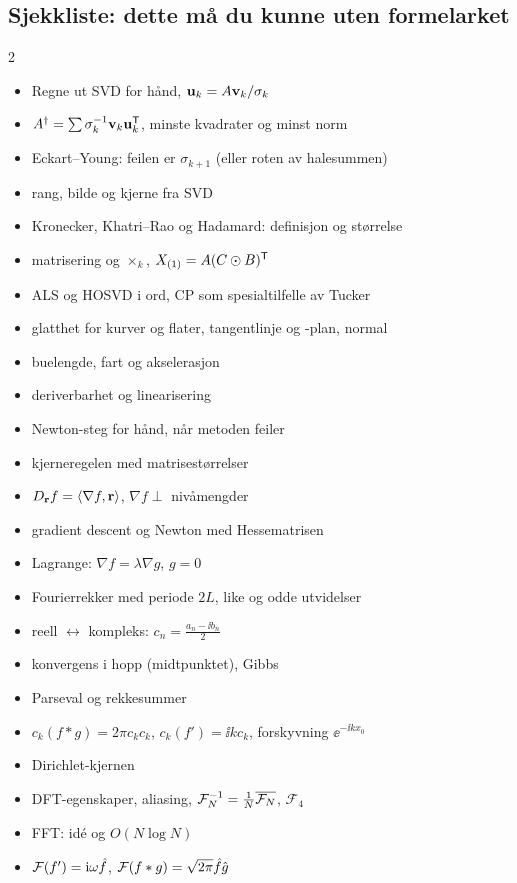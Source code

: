 \subsection{Sjekkliste: dette må du kunne uten formelarket}
\begin{multicols}{2}
\small
\begin{itemize}
  \item Regne ut SVD for hånd, $\mathbf{u}_k=A\mathbf{v}_k/\sigma_k$
  \item $A^\dagger=\sum\sigma_k^{-1}\mathbf{v}_k\mathbf{u}_k^{\mathsf{T}}$, minste kvadrater og minst norm
  \item Eckart--Young: feilen er $\sigma_{k+1}$ (eller roten av halesummen)
  \item rang, bilde og kjerne fra SVD
  \item Kronecker, Khatri--Rao og Hadamard: definisjon og størrelse
  \item matrisering og $\times_k$, $X_{(1)}=A(C\odot B)^{\mathsf{T}}$
  \item ALS og HOSVD i ord, CP som spesialtilfelle av Tucker
  \item glatthet for kurver og flater, tangentlinje og -plan, normal
  \item buelengde, fart og akselerasjon
  \item deriverbarhet og linearisering
  \item Newton-steg for hånd, når metoden feiler
  \item kjerneregelen med matrisestørrelser
  \item $D_{\mathbf{r}}f=\langle \nabla f,\mathbf{r}\rangle$, $\nabla f\perp$ nivåmengder
  \item gradient descent og Newton med Hessematrisen
  \item Lagrange: $\nabla f=\lambda\nabla g$, $g=0$
  \item Fourierrekker med periode $2L$, like og odde utvidelser
  \item reell $\leftrightarrow$ kompleks: $c_n=\frac{a_n-\ii b_n}2$
  \item konvergens i hopp (midtpunktet), Gibbs
  \item Parseval og rekkesummer
  \item $c_k(f*g)=2\pi c_kc_k$, $c_k(f')=\ii kc_k$, forskyvning $\ee^{-\ii kx_0}$
  \item Dirichlet-kjernen
  \item DFT-egenskaper, aliasing, $\mathcal{F}_N^{-1}=\frac1N\overline{\mathcal{F}_N}$, $\mathcal F_4$
  \item FFT: idé og $O(N\log N)$
  \item $\mathcal{F}(f')=\mathrm{i}\omega\hat f$, $\mathcal{F}(f*g)=\sqrt{2\pi}\hat f\hat g$

\end{itemize}
\end{multicols}
